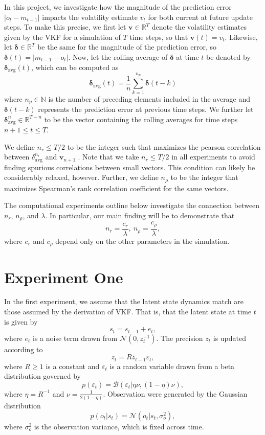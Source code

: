 \documentclass[12pt]{article}
\newcommand{\R}{\mathbb{R}}
\newcommand{\eps}{\varepsilon}
\theoremstyle{definition}
\begin{document}
In this project, we investigate how the magnitude of the prediction error $|o_t-m_{t-1}|$ impacts the volatility estimate $v_t$ for both current at future update steps. 
To make this precise, we first let $\mathbf{v} \in \R^T$ denote the volatility estimates given by the VKF for a simulation of $T$ time steps, so that $\mathbf{v}(t) = v_t$. 
Likewise, let $\mathbf{\delta} \in \R^T$ be the same for the magnitude of the prediction error, so $\mathbf{\delta}(t) = |m_{t-1} - o_t|$.
Now, let the rolling average of $\mathbf{\delta}$ at time $t$ be denoted by $\mathbf{\delta}_{\text{avg}}(t)$, which can be computed as
$$
\mathbf{\delta}_{\text{avg}}(t) = \frac{1}{n} \sum_{k=1}^{n_p} \mathbf{\delta}(t-k)
$$
where $n_p \in \mathbb{N}$ is the number of preceding elements included in the average and $\mathbf{\delta}(t-k)$ represents the prediction error at previous time steps. 
We further let $\mathbf{\delta}_{\text{avg}}^n \in \R^{T-n}$ to be the vector containing the rolling averages for time steps $n+1\leq t \leq T$.

We define $n_r \leq T/2$ to be the integer such that maximizes the pearson correlation between $\delta_{\text{avg}}^{n_r}$ and $\mathbf{v}_{n+1:}$. 
Note that we take $n_r \leq T/2$ in all experiments to avoid finding spurious correlations between small vectors.
This condition can likely be considerably relaxed, however. 
Further, we define $n_\rho$ to be the integer that maximizes Spearman's rank correlation coefficient for the same vectors. 

The computational experiments outline below investigate the connection between $n_r$, $n_\rho$, and $\lambda$.
In particular, our main finding will be to demonstrate that 
$$n_r = \frac{c_r}{\lambda}, \: n_\rho = \frac{c_\rho}{\lambda},$$
where $c_r$ and $c_\rho$ depend only on the other parameters in the simulation.

\section*{Experiment One}

In the first experiment, we assume that the latent state dynamics match are those assumed by the derivation of VKF. That is, that the latent state at time $t$ is given by 
$$s_t = s_{t-1}+e_t,$$
where $e_t$ is a noise term drawn from $\mathcal{N}(0,z_t^{-1}).$ 
The precision $z_t$ is updated according to 
$$z_t = Rz_{t-1}\eps_t,$$
where $R \geq 1$ is a constant and $\eps_t$ is a random variable drawn from a beta distribution governed by 
$$p(\eps_t) = \mathcal{B}(\eps_t \vert \eta\nu, (1-\eta)\nu),$$
where $\eta = R^{-1}$ and $\nu = \frac{1}{2(1-\eta)}$.
Observation were generated by the Gaussian distribution
$$p(o_t | s_t)=\mathcal{N}(o_t | s_t, \sigma_o^2),$$
where $\sigma_o^2$ is the observation variance, which is fixed across time. 
\end{document}
